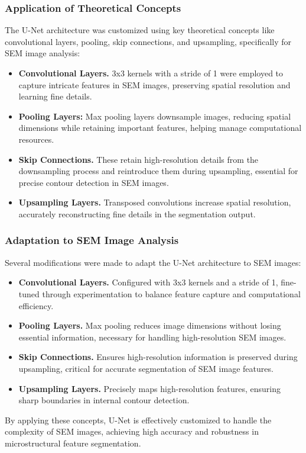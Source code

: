 \documentclass{ieeeaccess}
\begin{document}
\subsubsection{Application of Theoretical Concepts}
The U-Net architecture was customized using key theoretical concepts like convolutional layers, pooling, skip connections, and upsampling, specifically for SEM image analysis:
\begin{itemize}
    \item \textbf{Convolutional Layers.} 3x3 kernels with a stride of 1 were employed to capture intricate features in SEM images, preserving spatial resolution and learning fine details.
    \item \textbf{Pooling Layers:} Max pooling layers downsample images, reducing spatial dimensions while retaining important features, helping manage computational resources.
    \item \textbf{Skip Connections.} These retain high-resolution details from the downsampling process and reintroduce them during upsampling, essential for precise contour detection in SEM images.
    \item \textbf{Upsampling Layers.} Transposed convolutions increase spatial resolution, accurately reconstructing fine details in the segmentation output.
\end{itemize}

\subsubsection{Adaptation to SEM Image Analysis}
Several modifications were made to adapt the U-Net architecture to SEM images:
\begin{itemize}
    \item \textbf{Convolutional Layers.} Configured with 3x3 kernels and a stride of 1, fine-tuned through experimentation to balance feature capture and computational efficiency.
    \item \textbf{Pooling Layers.} Max pooling reduces image dimensions without losing essential information, necessary for handling high-resolution SEM images.
    \item \textbf{Skip Connections.} Ensures high-resolution information is preserved during upsampling, critical for accurate segmentation of SEM image features.
    \item \textbf{Upsampling Layers.} Precisely maps high-resolution features, ensuring sharp boundaries in internal contour detection.
\end{itemize}
By applying these concepts, U-Net is effectively customized to handle the complexity of SEM images, achieving high accuracy and robustness in microstructural feature segmentation.
\end{document}
